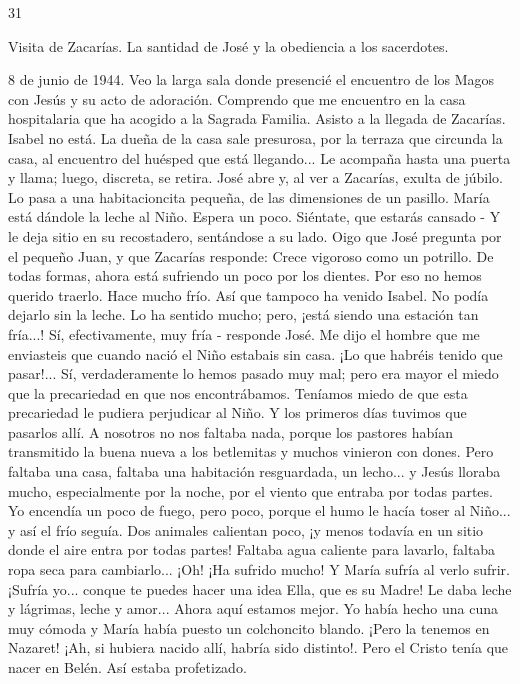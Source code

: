 \documentclass[12pt]{book} %
\begin{document}
 
31 
 
Visita de Zacarías. La santidad de José y la obediencia a los sacerdotes. 
 
8 de junio de 1944. 
Veo la larga sala donde presencié el encuentro de los Magos con Jesús y su acto de adoración. Comprendo que me 
encuentro en la casa hospitalaria que ha acogido a la Sagrada Familia. Asisto a la llegada de Zacarías. Isabel no está. 
La dueña de la casa sale presurosa, por la terraza que circunda la casa, al encuentro del huésped que está llegando... Le 
acompaña hasta una puerta y llama; luego, discreta, se retira. 
José abre y, al ver a Zacarías, exulta de júbilo. Lo pasa a una habitacioncita pequeña, de las dimensiones de un pasillo. 
María está dándole la leche al Niño. Espera un poco. Siéntate, que estarás cansado - Y le deja sitio en su recostadero, 
sentándose a su lado. 
Oigo que José pregunta por el pequeño Juan, y que Zacarías responde: 
Crece vigoroso como un potrillo. De todas formas, ahora está sufriendo un poco por los dientes. Por eso no hemos 
querido traerlo. Hace mucho frío. Así que tampoco ha venido Isabel. No podía dejarlo sin la leche. Lo ha sentido mucho; pero, ¡está siendo una estación tan fría...! 
Sí, efectivamente, muy fría - responde José. 
Me dijo el hombre que me enviasteis que cuando nació el Niño estabais sin casa. ¡Lo que habréis tenido que pasar!... 
Sí, verdaderamente lo hemos pasado muy mal; pero era mayor el miedo que la precariedad en que nos encontrábamos. Teníamos miedo de que esta precariedad le pudiera perjudicar al Niño. Y los primeros días tuvimos que pasarlos allí. A nosotros no nos faltaba nada, porque los pastores habían transmitido la buena nueva a los betlemitas y muchos vinieron con dones. Pero faltaba una casa, faltaba una habitación resguardada, un lecho... y Jesús lloraba mucho, especialmente por la noche, por el viento que entraba por todas partes. Yo encendía un poco de fuego, pero poco, porque el humo le hacía toser al Niño... y así el frío seguía. Dos animales calientan poco, ¡y menos todavía en un sitio donde el aire entra por todas partes! Faltaba agua caliente para lavarlo, faltaba ropa seca para cambiarlo... ¡Oh! ¡Ha sufrido mucho! Y María sufría al verlo sufrir. ¡Sufría yo... conque te puedes hacer una idea Ella, que es su Madre! Le daba leche y lágrimas, leche y amor... Ahora aquí estamos mejor. Yo había hecho una cuna muy cómoda y María había puesto un colchoncito blando. ¡Pero la tenemos en Nazaret! ¡Ah, si hubiera nacido allí, habría sido distinto!. 
Pero el Cristo tenía que nacer en Belén. Así estaba profetizado. 
\end{document}
